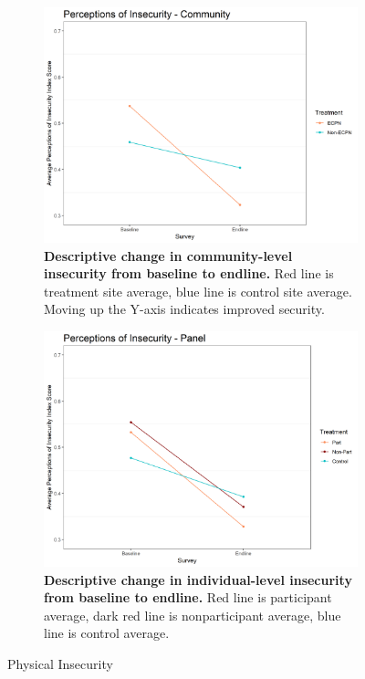 \documentclass[11pt]{article}
\begin{document}
\begin{figure}[H]
    \begin{subfigure}[b]{.48\textwidth}
    \centering
        \includegraphics[width=\linewidth]{../../../figs/inComm_plot.png}
        \caption{\textbf{Descriptive change in community-level insecurity from baseline to endline.} Red line is treatment site average, blue line is control site average.  Moving up the Y-axis indicates improved security.}
        \label{fig:fig7}
    \end{subfigure}
    \hfill
    \begin{subfigure}[b]{.48\textwidth}
    \centering
        \includegraphics[width=\linewidth]{../../../figs/inPan_plot.png}
        \caption{\textbf{Descriptive change in individual-level insecurity from baseline to endline.} Red line is participant average, dark red line is nonparticipant average, blue line is control average.}
        \label{fig:fig8}
    \end{subfigure}
    \caption{Physical Insecurity}
\end{figure}
\end{document}
